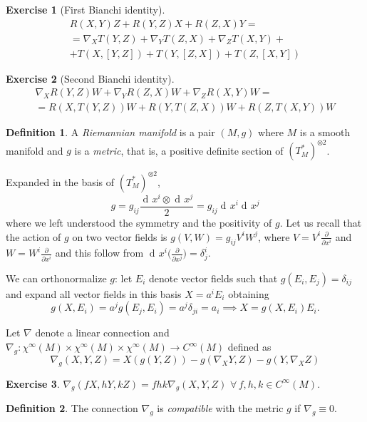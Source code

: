 \documentclass[a4paper,12pt]{book}
\newcommand{\dd}{\mathop{\mathrm{d}\!}{}}
\theoremstyle{definition}
\newtheorem{definition}{Definition}
\newtheorem{exercise}{Exercise}
\theoremstyle{remark}
\begin{document}
\begin{exercise}[First Bianchi identity]
\label{bianchitorsion}
\begin{multline*}
R(X,Y)Z+R(Y,Z)X+R(Z,X)Y=\\
=\nabla_XT(Y,Z)+\nabla_YT(Z,X)+\nabla_ZT(X,Y)+\\
+T(X,[Y,Z])+T(Y,[Z,X])+T(Z,[X,Y])
\end{multline*}
\end{exercise}

\begin{exercise}[Second Bianchi identity]
\begin{multline*}\nabla_XR(Y,Z)W+\nabla_YR(Z,X)W+\nabla_ZR(X,Y)W=\\
=R(X,T(Y,Z))W+R(Y,T(Z,X))W+R(Z,T(X,Y))W\end{multline*}
\end{exercise}

\begin{definition}
A \emph{Riemannian manifold} is a pair $(M,g)$ where $M$ is a smooth manifold and $g$ is a \emph{metric}, that is, a positive definite section of $(T_M^*)^{\otimes2}$.
\end{definition}

Expanded in the basis of $(T_M^*)^{\otimes2}$,
\[g=g_{ij}\frac{\dd x^i\otimes\dd x^j}{2}=g_{ij}\dd x^i\dd x^j\]
where we left understood the symmetry and the positivity of $g$. Let us recall that the action of $g$ on two vector fields is $g(V,W)=g_{ij}V^iW^j$, where $V=V^i\frac{\partial}{\partial x^i}$ and $W=W^i\frac{\partial}{\partial x^i}$ and this follow from $\dd x^i\bigl(\frac{\partial}{\partial x^j}\bigr)=\delta^i_j$.

We can orthonormalize $g$: let $E_i$ denote vector fields such that $g(E_i,E_j)=\delta_{ij}$ and expand all vector fields in this basis $X=a^iE_i$ obtaining
\[g(X,E_i)=a^jg(E_j,E_i)=a^j\delta_{ji}=a_i\implies X=g(X,E_i)E_i.\]

Let $\nabla$ denote a linear connection and $\nabla_g\colon\chi^\infty(M)\times\chi^\infty(M)\times\chi^\infty(M)\to C^\infty(M)$ defined as
\[\nabla_g(X,Y,Z)=X(g(Y,Z))-g(\nabla_XY,Z)-g(Y,\nabla_XZ)\]

\begin{exercise}
$\nabla_g(fX,hY,kZ)=fhk\nabla_g(X,Y,Z)$ $\forall\,f,h,k\in C^\infty(M)$.
\end{exercise}

\begin{definition}
The connection $\nabla_g$ is \emph{compatible} with the metric $g$ if $\nabla_g\equiv0$.
\end{definition}
\end{document}
